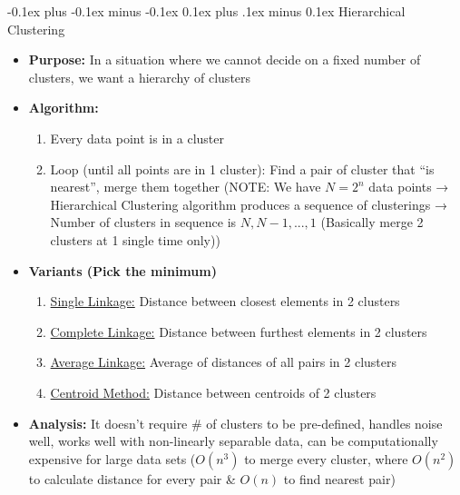 \documentclass[landscape]{article}
\makeatletter
\renewcommand{\subsection}{\@startsection{subsection}{2}{0mm}%
  {-0.1ex plus -0.1ex minus -0.1ex}%
  {0.1ex plus .1ex minus 0.1ex}%
{\normalfont\scriptsize\bfseries}}
\makeatother
\begin{document}
\begin{multicols*}{5}
        \subsection{Hierarchical Clustering}
        \begin{itemize}
          \item \textbf{Purpose:} In a situation where we cannot decide on a fixed number of clusters, we want a hierarchy of clusters
          \item \textbf{Algorithm:}
          \begin{enumerate}
            \item Every data point is in a cluster
            \item Loop (until all points are in 1 cluster): Find a pair of cluster that “is nearest”, merge them together (NOTE: We have $N=2^n$ data points → Hierarchical Clustering algorithm produces a sequence of clusterings → Number of clusters in sequence is $N, N-1, ..., 1$ (Basically merge 2 clusters at 1 single time only))
          \end{enumerate}
          \item \textbf{Variants (Pick the minimum)}
          \begin{enumerate}
            \item \underline{Single Linkage:} Distance between closest elements in 2 clusters
            \item \underline{Complete Linkage:} Distance between furthest elements in 2 clusters
            \item \underline{Average Linkage:} Average of distances of all pairs in 2 clusters
            \item \underline{Centroid Method:} Distance between centroids of 2 clusters
          \end{enumerate}
          \item \textbf{Analysis:} It doesn't require \# of clusters to be pre-defined, handles noise well, works well with non-linearly separable data, can be computationally expensive for large data sets ($O(n^3)$ to merge every cluster, where $O(n^2)$ to calculate distance for every pair \& $O(n)$ to find nearest pair) 
        \end{itemize}


\end{multicols*}
\end{document}
